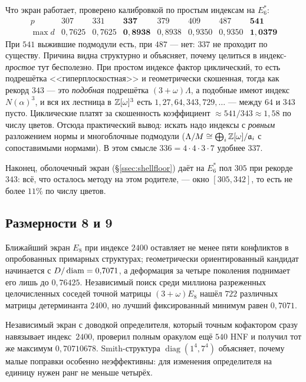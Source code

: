 Что экран работает, проверено калибровкой по простым индексам на $E_6^*$:
\[
\begin{array}{c|ccccccc}
p & 307 & 331 & \mathbf{337} & 379 & 409 & 487 & \mathbf{541}\\\hline
\max d & 0{,}7625 & 0{,}7625 & \mathbf{0{,}8938} & 0{,}8938 & 0{,}9350 &
0{,}9350 & \mathbf{1{,}0379}
\end{array}
\]
При $541$ выжившие подмодули есть, при $487$ --- нет: $337$ не проходит по
существу. Причина видна структурно и объясняет, почему целиться в
индекс-\emph{простое} тут бесполезно. При простом индексе фактор циклический,
то есть подрешётка <<гиперплоскостная>> и геометрически скошенная, тогда как
рекорд $343$ --- это \emph{подобная} подрешётка $(3+\omega)\Lambda$, а подобные
имеют индекс $N(\alpha)^3$, и вся их лестница в $\mathbb{Z}[\omega]^3$ есть
$1,27,64,343,729,\dots$ --- между $64$ и $343$ пусто. Циклические платят за
скошенность коэффициент $\approx541/343\approx1{,}58$ по числу цветов.
Отсюда практический вывод: искать надо индексы с \emph{ровным} разложением
нормы и многоблочные подмодули ($\Lambda/M\cong\bigoplus_i\mathbb{Z}[\omega]/\mathfrak
a_i$ с сопоставимыми нормами). В этом смысле $336=4\cdot4\cdot3\cdot7$ удобнее
$337$.

Наконец, оболочечный экран (\S\ref{ssec:shellfloor}) даёт на $E_6^*$ пол
$305$ при рекорде $343$: всё, что осталось методу на этом родителе, --- окно
$[305,342]$, то есть не более $11\%$ по числу цветов.

\subsection{Размерности 8 и 9}\label{app:d89}

Ближайший экран $E_8$ при индексе $2400$
оставляет не менее пяти конфликтов в опробованных примарных структурах;
геометрически ориентированный кандидат начинается с $D/\operatorname{diam}=0{,}7071$, а
деформация за четыре поколения поднимает его лишь до $0{,}76425$. Независимый
поиск среди миллиона разреженных целочисленных соседей точной матрицы
$(3+\omega)E_8$ нашёл $722$ различных матрицы детерминанта $2400$, но лучший
фиксированный минимум равен $0{,}7071$.

Независимый экран с доводкой определителя, который точным кофактором сразу
навязывает индекс~$2400$, проверил полным оракулом ещё $540$ HNF и получил тот
же максимум $0{,}70710678$. Smith-структура
$\operatorname{diag}(1^4,7^4)$ объясняет, почему малые поправки особенно
неэффективны: для изменения определителя на единицу нужен ранг не меньше
четырёх.

